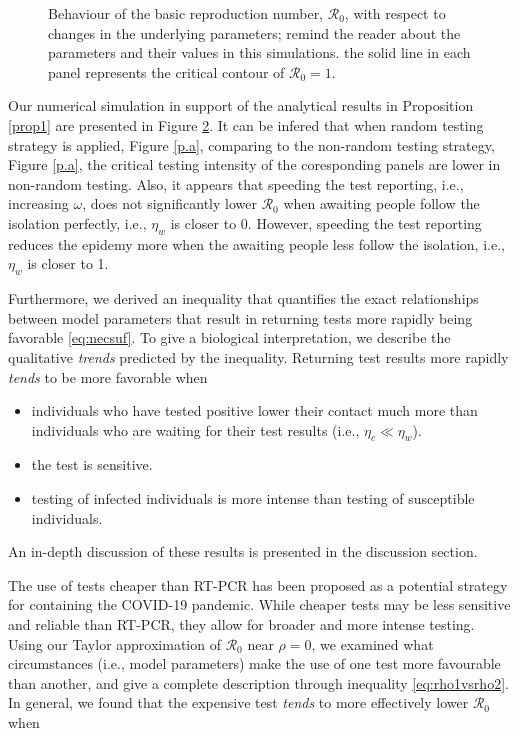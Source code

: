 \documentclass[12pt]{article}
\newcommand{\Rnum}{\mathcal{R}_0}
\theoremstyle{definition} %
\begin{document}
\begin{figure}[h!]
\begin{subfigure}[t]{.45\textwidth}
\caption{}\label{p.b}
\end{subfigure}
\caption{Behaviour of the basic reproduction number, $\Rnum$, with respect to changes in the underlying parameters; remind the reader about the parameters and their values in this simulations. the solid line in each panel represents the critical contour of $\Rnum=1$.}
\label{pan}
\end{figure}

Our numerical simulation in support of the analytical results in Proposition \ref{prop1} are presented in Figure \ref{pan}. It can be infered that when random testing strategy is applied, Figure \ref{p.a}, comparing to the non-random testing strategy, Figure \ref{p.a}, the critical testing intensity of the coresponding panels are lower in non-random testing. Also, it appears that speeding the test reporting, i.e., increasing $\omega$, does not significantly lower $\Rnum$ when awaiting people follow the isolation perfectly, i.e., $\eta_w$ is closer to 0. However, speeding the test reporting reduces the epidemy more when the awaiting people less follow the isolation, i.e., $\eta_w$ is closer to 1. 

Furthermore, we derived an inequality that quantifies the exact relationships between model parameters that result in returning tests more rapidly being favorable \eqref{eq:necsuf}. To give a biological interpretation, we describe the qualitative \textit{trends} predicted by the inequality. Returning test results more rapidly \textit{tends} to be more favorable when

\begin{itemize}
    \item individuals who have tested positive lower their contact much more than individuals who are waiting for their test results (i.e., $\eta_c \ll \eta_w$).
    \item the test is sensitive.
    \item testing of infected individuals is more intense than testing of susceptible individuals.
\end{itemize}
An in-depth discussion of these results is presented in the discussion section. 

The use of tests cheaper than RT-PCR has been proposed as a potential strategy for containing the COVID-19 pandemic. While cheaper tests may be less sensitive and reliable than RT-PCR, they allow for broader and more intense testing. Using our Taylor approximation of $\Rnum$ near $\rho = 0$, we examined what circumstances (i.e., model parameters) make the use of one test more favourable than another, and give a complete description through inequality \ref{eq:rho1vsrho2}. In general, we found that the expensive test \textit{tends} to more effectively lower $\Rnum$ when
\end{document}
